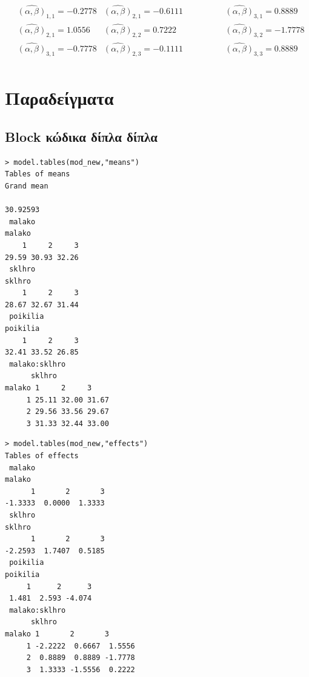 \documentclass[12pt]{article}
\begin{document}
\begin{align*}
    &\hat{(\alpha,\beta)}_{1,1}=-0.2778 &\hat{(\alpha,\beta)}_{2,1}=-0.6111\hspace{50pt} &\hat{(\alpha,\beta)}_{3,1}=0.8889\\
    &\hat{(\alpha,\beta)}_{2,1}=1.0556 &\hat{(\alpha,\beta)}_{2,2}=0.7222   \hspace{50pt} &\hat{(\alpha,\beta)}_{3,2}=-1.7778\\
    &\hat{(\alpha,\beta)}_{3,1}=-0.7778 &\hat{(\alpha,\beta)}_{2,3}=-0.1111 \hspace{50pt} &\hat{(\alpha,\beta)}_{3,3}=0.8889\\
\end{align*}


\section{Παραδείγματα}
\subsection{\textlatin{Block} κώδικα δίπλα δίπλα }

\begin{otherlanguage}{english}

\begin{minipage}{0.45\linewidth}
\begin{lstlisting}[escapechar=\%]
> model.tables(mod_new,"means") 
Tables of means
Grand mean
         
30.92593 
 malako 
malako
    1     2     3 
29.59 30.93 32.26 
 sklhro 
sklhro
    1     2     3 
28.67 32.67 31.44 
 poikilia 
poikilia
    1     2     3 
32.41 33.52 26.85 
 malako:sklhro 
      sklhro
malako 1     2     3    
     1 25.11 32.00 31.67
     2 29.56 33.56 29.67
     3 31.33 32.44 33.00
\end{lstlisting}
\end{minipage}\hfill
\begin{minipage}{0.45\linewidth}
\begin{lstlisting}
> model.tables(mod_new,"effects") 
Tables of effects
 malako 
malako
      1       2       3 
-1.3333  0.0000  1.3333 
 sklhro 
sklhro
      1       2       3 
-2.2593  1.7407  0.5185 
 poikilia 
poikilia
     1      2      3 
 1.481  2.593 -4.074 
 malako:sklhro 
      sklhro
malako 1       2       3      
     1 -2.2222  0.6667  1.5556
     2  0.8889  0.8889 -1.7778
     3  1.3333 -1.5556  0.2222
\end{lstlisting}
\end{minipage}
\end{otherlanguage}
\end{document}
